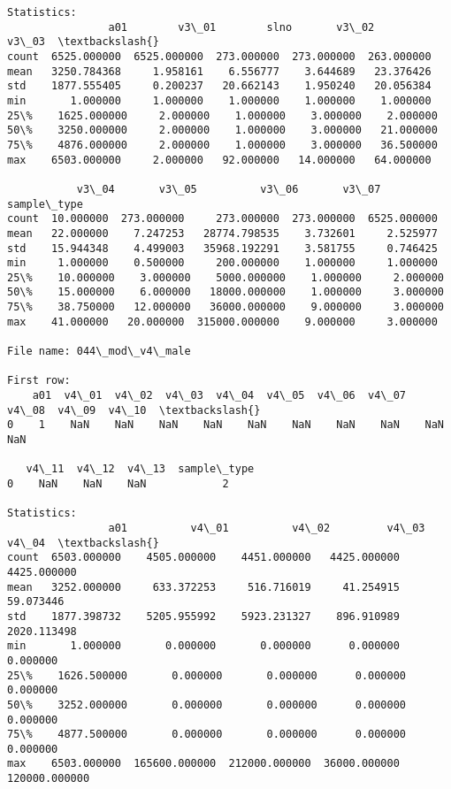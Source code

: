 \documentclass[11pt]{article}
\begin{document}
\begin{Verbatim}[commandchars=\\\{\}]
Statistics: 
                a01        v3\_01        slno       v3\_02       v3\_03  \textbackslash{}
count  6525.000000  6525.000000  273.000000  273.000000  263.000000   
mean   3250.784368     1.958161    6.556777    3.644689   23.376426   
std    1877.555405     0.200237   20.662143    1.950240   20.056384   
min       1.000000     1.000000    1.000000    1.000000    1.000000   
25\%    1625.000000     2.000000    1.000000    3.000000    2.000000   
50\%    3250.000000     2.000000    1.000000    3.000000   21.000000   
75\%    4876.000000     2.000000    1.000000    3.000000   36.500000   
max    6503.000000     2.000000   92.000000   14.000000   64.000000   

           v3\_04       v3\_05          v3\_06       v3\_07  sample\_type  
count  10.000000  273.000000     273.000000  273.000000  6525.000000  
mean   22.000000    7.247253   28774.798535    3.732601     2.525977  
std    15.944348    4.499003   35968.192291    3.581755     0.746425  
min     1.000000    0.500000     200.000000    1.000000     1.000000  
25\%    10.000000    3.000000    5000.000000    1.000000     2.000000  
50\%    15.000000    6.000000   18000.000000    1.000000     3.000000  
75\%    38.750000   12.000000   36000.000000    9.000000     3.000000  
max    41.000000   20.000000  315000.000000    9.000000     3.000000  

File name: 044\_mod\_v4\_male

First row: 
    a01  v4\_01  v4\_02  v4\_03  v4\_04  v4\_05  v4\_06  v4\_07  v4\_08  v4\_09  v4\_10  \textbackslash{}
0    1    NaN    NaN    NaN    NaN    NaN    NaN    NaN    NaN    NaN    NaN   

   v4\_11  v4\_12  v4\_13  sample\_type  
0    NaN    NaN    NaN            2  

Statistics: 
                a01          v4\_01          v4\_02         v4\_03          v4\_04  \textbackslash{}
count  6503.000000    4505.000000    4451.000000   4425.000000    4425.000000   
mean   3252.000000     633.372253     516.716019     41.254915      59.073446   
std    1877.398732    5205.955992    5923.231327    896.910989    2020.113498   
min       1.000000       0.000000       0.000000      0.000000       0.000000   
25\%    1626.500000       0.000000       0.000000      0.000000       0.000000   
50\%    3252.000000       0.000000       0.000000      0.000000       0.000000   
75\%    4877.500000       0.000000       0.000000      0.000000       0.000000   
max    6503.000000  165600.000000  212000.000000  36000.000000  120000.000000   


\end{Verbatim}
\end{document}
